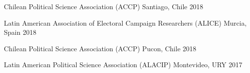 \begin{cvhonors}
\cvconf
{Chilean Political Science Association (ACCP)} 
{Santiago, Chile}
{2018}
\end{cvhonors}

\begin{cvhonors}
\cvconf
{Latin American Association of Electoral Campaign Researchers (ALICE)} 
{Murcia, Spain}
{2018}
\end{cvhonors}

\begin{cvhonors}
\cvconf
{Chilean Political Science Association (ACCP)} 
{Pucon, Chile}
{2018}
\end{cvhonors}

\begin{cvhonors}
\cvconf
{Latin American Political Science Association (ALACIP)} 
{Montevideo, URY}
{2017}
\end{cvhonors}








